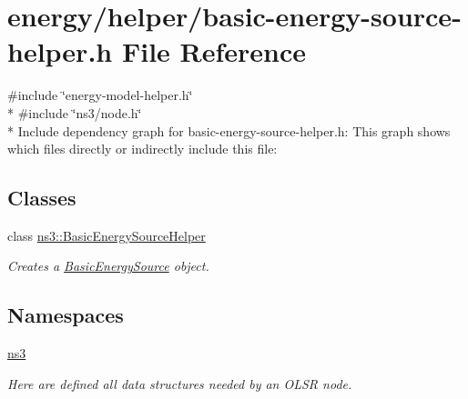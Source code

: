 \hypertarget{basic-energy-source-helper_8h}{}\section{energy/helper/basic-\/energy-\/source-\/helper.h File Reference}
\label{basic-energy-source-helper_8h}
{\ttfamily \#include \char`\"{}energy-\/model-\/helper.\+h\char`\"{}}\\*
{\ttfamily \#include \char`\"{}ns3/node.\+h\char`\"{}}\\*
Include dependency graph for basic-\/energy-\/source-\/helper.h\+:
This graph shows which files directly or indirectly include this file\+:
\subsection*{Classes}
\begin{DoxyCompactItemize}
\item 
class \hyperlink{classns3_1_1BasicEnergySourceHelper}{ns3\+::\+Basic\+Energy\+Source\+Helper}
\begin{DoxyCompactList}\small\item\em Creates a \hyperlink{classns3_1_1BasicEnergySource}{Basic\+Energy\+Source} object. \end{DoxyCompactList}\end{DoxyCompactItemize}
\subsection*{Namespaces}
\begin{DoxyCompactItemize}
\item 
 \hyperlink{namespacens3}{ns3}
\begin{DoxyCompactList}\small\item\em Here are defined all data structures needed by an O\+L\+SR node. \end{DoxyCompactList}\end{DoxyCompactItemize}
